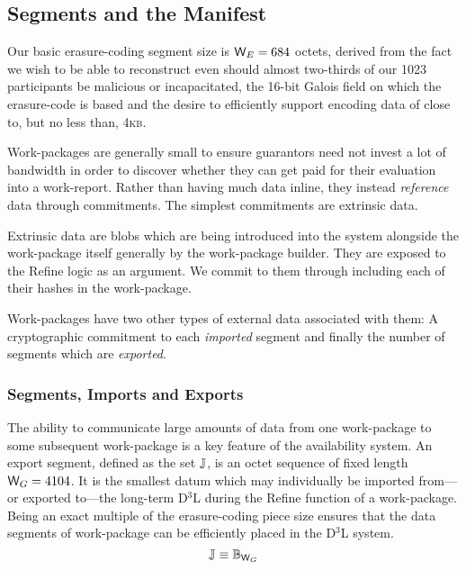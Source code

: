 \subsection{Segments and the Manifest}

Our basic erasure-coding segment size is $\Cecpiecesize = 684$ octets, derived from the fact we wish to be able to reconstruct even should almost two-thirds of our 1023 participants be malicious or incapacitated, the 16-bit Galois field on which the erasure-code is based and the desire to efficiently support encoding data of close to, but no less than, 4\textsc{kb}.

Work-packages are generally small to ensure guarantors need not invest a lot of bandwidth in order to discover whether they can get paid for their evaluation into a work-report. Rather than having much data inline, they instead \emph{reference} data through commitments. The simplest commitments are extrinsic data.

Extrinsic data are blobs which are being introduced into the system alongside the work-package itself generally by the work-package builder. They are exposed to the Refine logic as an argument. We commit to them through including each of their hashes in the work-package.

Work-packages have two other types of external data associated with them: A cryptographic commitment to each \emph{imported} segment and finally the number of segments which are \emph{exported}.

\subsubsection{Segments, Imports and Exports}
\label{sec:segments}

The ability to communicate large amounts of data from one work-package to some subsequent work-package is a key feature of the \Jam availability system. An export segment, defined as the set $\segment$, is an octet sequence of fixed length $\Csegmentsize = 4104$. It is the smallest datum which may individually be imported from---or exported to---the long-term D$^3$L during the Refine function of a work-package. Being an exact multiple of the erasure-coding piece size ensures that the data segments of work-package can be efficiently placed in the D$^3$L system.
\begin{equation}\label{eq:segment}
  \segment \equiv \blob[\Csegmentsize]
\end{equation}

